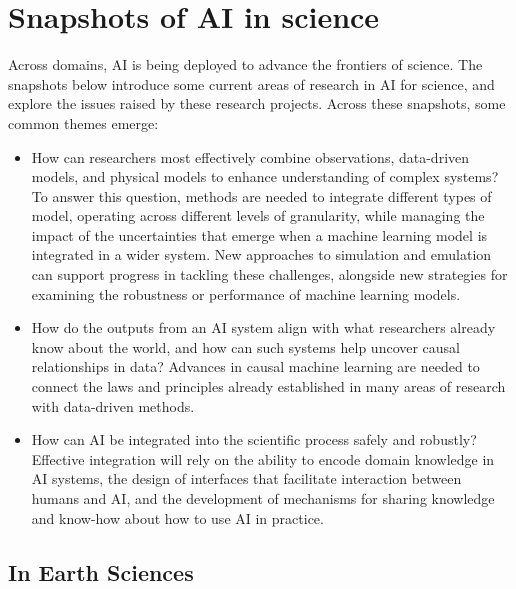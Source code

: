 \section{Snapshots of AI in science}\label{snapshots-of-ai-in-science}

Across domains, AI is being deployed to advance the frontiers of
science. The snapshots below introduce some current areas of research in
AI for science, and explore the issues raised by these research
projects. Across these snapshots, some common themes emerge:

\begin{itemize}
\item
  How can researchers most effectively combine observations, data-driven
  models, and physical models to enhance understanding of complex
  systems? To answer this question, methods are needed to integrate
  different types of model, operating across different levels of
  granularity, while managing the impact of the uncertainties that
  emerge when a machine learning model is integrated in a wider system.
  New approaches to simulation and emulation can support progress in
  tackling these challenges, alongside new strategies for examining the
  robustness or performance of machine learning models.
\item
  How do the outputs from an AI system align with what researchers
  already know about the world, and how can such systems help uncover
  causal relationships in data? Advances in causal machine learning are
  needed to connect the laws and principles already established in many
  areas of research with data-driven methods.
\item
  How can AI be integrated into the scientific process safely and
  robustly? Effective integration will rely on the ability to encode
  domain knowledge in AI systems, the design of interfaces that
  facilitate interaction between humans and AI, and the development of
  mechanisms for sharing knowledge and know-how about how to use AI in
  practice.
\end{itemize}


\subsection{In Earth Sciences}\label{in-earth-sciences}

